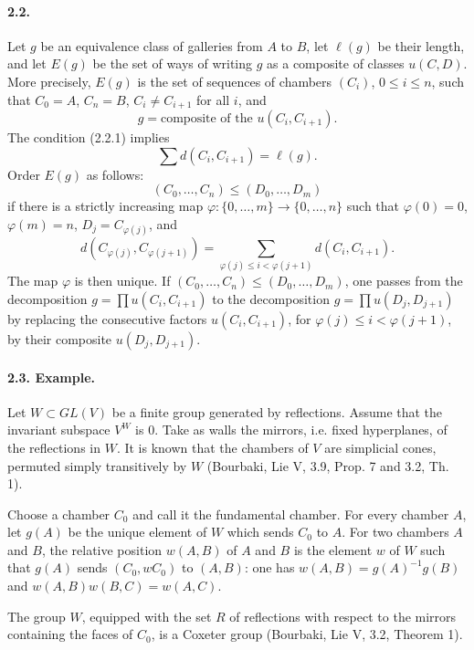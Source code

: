 \documentclass[11pt]{article}
\begin{document}
\paragraph{2.2.} Let $g$ be an equivalence class of galleries from $A$ to $B$, let $\ell(g)$ be their length, and let $E(g)$ be the set of ways of writing $g$ as a composite of classes $u(C,D)$. More precisely, $E(g)$ is the set of sequences of chambers $(C_i)$, $0\leq i\leq n$, such that $C_0=A$, $C_n=B$, $C_i\ne C_{i+1}$ for all $i$, and
\begin{equation}
 g=\text{composite of the }u(C_i,C_{i+1}).
\tag{2.2.1}
\end{equation}
The condition (2.2.1) implies
\begin{equation}
 \sum d(C_i,C_{i+1})=\ell(g).
\tag{2.2.2}
\end{equation}
Order $E(g)$ as follows:
\[
 (C_0,\ldots,C_n)\leq(D_0,\ldots,D_m)
\]
if there is a strictly increasing map $\varphi:\{0,\ldots,m\}\to\{0,\ldots,n\}$ such that $\varphi(0)=0$, $\varphi(m)=n$, $D_j=C_{\varphi(j)}$, and
\[
 d(C_{\varphi(j)},C_{\varphi(j+1)})=\sum_{\varphi(j)\leq i<\varphi(j+1)}d(C_i,C_{i+1}).
\]
The map $\varphi$ is then unique. If $(C_0,\ldots,C_n)\leq(D_0,\ldots,D_m)$, one passes from the decomposition $g=\prod u(C_i,C_{i+1})$ to the decomposition $g=\prod u(D_j,D_{j+1})$ by replacing the consecutive factors $u(C_i,C_{i+1})$, for $\varphi(j)\leq i<\varphi(j+1)$, by their composite $u(D_j,D_{j+1})$.

\paragraph{2.3. Example.} Let $W\subset GL(V)$ be a finite group generated by reflections. Assume that the invariant subspace $V^W$ is $0$. Take as walls the mirrors, i.e. fixed hyperplanes, of the reflections in $W$. It is known that the chambers of $V$ are simplicial cones, permuted simply transitively by $W$ (Bourbaki, Lie V, 3.9, Prop. 7 and 3.2, Th. 1).

Choose a chamber $C_0$ and call it the fundamental chamber. For every chamber $A$, let $g(A)$ be the unique element of $W$ which sends $C_0$ to $A$. For two chambers $A$ and $B$, the relative position $w(A,B)$ of $A$ and $B$ is the element $w$ of $W$ such that $g(A)$ sends $(C_0,wC_0)$ to $(A,B)$: one has $w(A,B)=g(A)^{-1}g(B)$ and $w(A,B)w(B,C)=w(A,C)$.

The group $W$, equipped with the set $R$ of reflections with respect to the mirrors containing the faces of $C_0$, is a Coxeter group (Bourbaki, Lie V, 3.2, Theorem 1).
\end{document}
